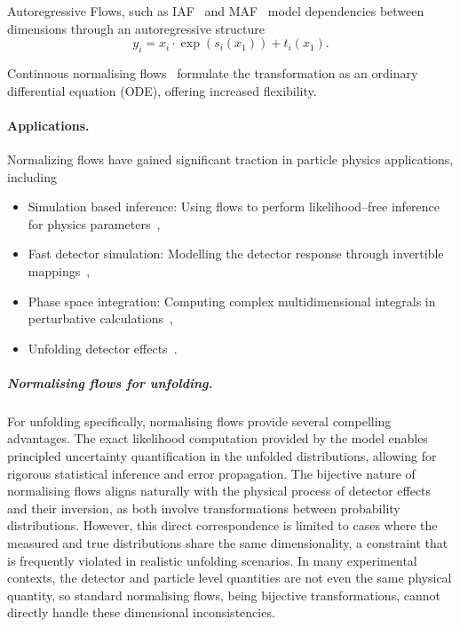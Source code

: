                 Autoregressive Flows, such as IAF~\cite{kingma_improving_2017} and MAF~\cite{papamakarios_masked_2018} model dependencies between dimensions through an autoregressive structure
                \begin{equation}
                    y_i = x_i \cdot \exp(s_i(x_{1})) + t_i(x_{1}).
                \end{equation}
                
                Continuous normalising flows~\cite{mathieu_riemannian_2020} formulate the transformation as an ordinary differential equation (ODE), offering increased flexibility.
        \paragraph{Applications.}
            Normalizing flows have gained significant traction in particle physics applications, including
            \begin{itemize}
                \item Simulation based inference: Using flows to perform likelihood--free inference for physics parameters~\cite{Green2020Gravitational-waveFlows},
                \item Fast detector simulation: Modelling the detector response through invertible mappings~\cite{krause_fast_2023},
                \item Phase space integration: Computing complex multidimensional integrals in perturbative calculations~\cite{Winterhalder2022TargetingNetworks},
                \item Unfolding detector effects~\cite{zeng_solving_2024}.
            \end{itemize}
            \subparagraph{Normalising flows for unfolding.}
                For unfolding specifically, normalising flows provide several compelling advantages.
                The exact likelihood computation provided by the model enables principled uncertainty quantification in the unfolded distributions, allowing for rigorous statistical inference and error propagation.
                The bijective nature of normalising flows aligns naturally with the physical process of detector effects and their inversion, as both involve transformations between probability distributions.
                However, this direct correspondence is limited to cases where the measured and true distributions share the same dimensionality, a constraint that is frequently violated in realistic unfolding scenarios.
                In many experimental contexts, the detector and particle level quantities are not even the same physical quantity, so standard normalising flows, being bijective transformations, cannot directly handle these dimensional inconsistencies.
                
